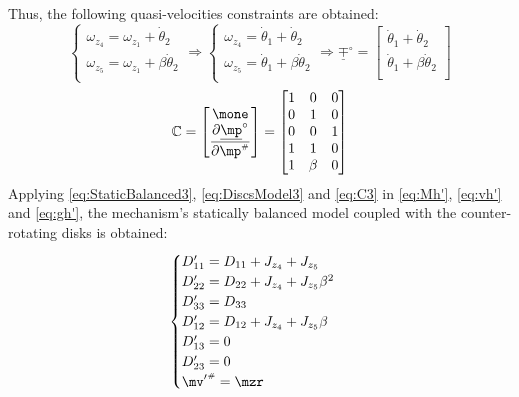 \documentclass[a4paper,11pt,brazil,fleqn]{article}
\begin{document}
Thus, the following quasi-velocities constraints are obtained:
\begin{equation}\label{eq:Quasi-velocitiesConstraints3}
\begin{cases}
\omega_{z_4} = \omega_{z_1} + \dot{\theta}_2 \\
\omega_{z_5} = \omega_{z_1} + \beta\dot{\theta}_2 \\
\end{cases}
\Rightarrow
\begin{cases}
\omega_{z_4} = \dot{\theta}_1 + \dot{\theta}_2 \\
\omega_{z_5} = \dot{\theta}_1 + \beta\dot{\theta}_2 \\
\end{cases}
\Rightarrow
\underline{\mp}^\circ = 
\begin{bmatrix}
\dot{\theta}_1 + \dot{\theta}_2 \\
\dot{\theta}_1 + \beta\dot{\theta}_2 \\
\end{bmatrix}
\end{equation}
\begin{equation}\label{eq:C3}
\mC =
\begin{bmatrix}
\mone \\
\displaystyle\frac{\partial \underline{\mp}^\circ}{\partial \mp\ssh}
\end{bmatrix}  =
\begin{bmatrix}
1 & 0 & 0 \\
0 & 1 & 0 \\
0 & 0 & 1 \\
1 & 1     & 0 \\
1 & \beta & 0 \\
\end{bmatrix} 
\end{equation}
Applying \eqref{eq:StaticBalanced3}, \eqref{eq:DiscsModel3} and \eqref{eq:C3} in \eqref{eq:Mh'}, \eqref{eq:vh'} and \eqref{eq:gh'}, the mechanism's statically balanced model coupled with the counter-rotating disks is obtained:
\begin{equation}\label{eq:CoupledDynamics3}
\begin{cases}
D'_{11} = D_{11} + J_{z_4} + J_{z_5} \\
D'_{22} = D_{22} + J_{z_4} + J_{z_5} \beta^2 \\
D'_{33} = D_{33} \\
D'_{12} = D_{12} + J_{z_4} + J_{z_5} \beta \\
D'_{13} = 0 \\
D'_{23} = 0\\
{\mv'}\ssh = \mzr \\
\end{cases}
\end{equation}
\end{document}
